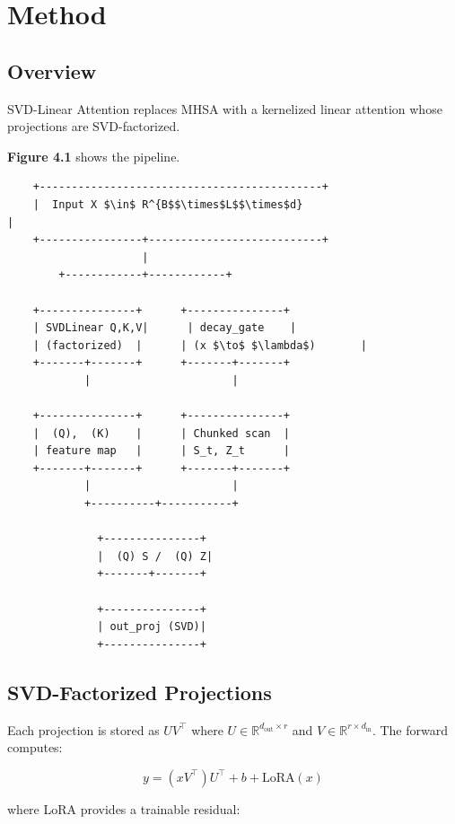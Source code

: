
\section{Method}

\subsection{Overview}

SVD-Linear Attention replaces MHSA with a kernelized linear attention 
whose projections are SVD-factorized.

\textbf{Figure 4.1} shows the pipeline.

\begin{lstlisting}
    +--------------------------------------------+
    |  Input X $\in$ R^{B$$\times$L$$\times$d}                        |
    +----------------+---------------------------+
                     |
        +------------+------------+
                                   
    +---------------+      +---------------+
    | SVDLinear Q,K,V|      | decay_gate    |
    | (factorized)  |      | (x $\to$ $\lambda$)       |
    +-------+-------+      +-------+-------+
            |                      |
                                    
    +---------------+      +---------------+
    |  (Q),  (K)    |      | Chunked scan  |
    | feature map   |      | S_t, Z_t      |
    +-------+-------+      +-------+-------+
            |                      |
            +----------+-----------+
                        
              +---------------+
              |  (Q) S /  (Q) Z|
              +-------+-------+
                       
              +---------------+
              | out_proj (SVD)|
              +---------------+
\end{lstlisting}

\subsection{SVD-Factorized Projections}

Each projection is stored as $U V^\top$ where $U \in \mathbb{R}^{d_\text{out} \times r}$ 
and $V \in \mathbb{R}^{r \times d_\text{in}}$. The forward computes:

\[
y = (x V^\top) U^\top + b + \text{LoRA}(x)
\tag{4.1}
\]

where LoRA provides a trainable residual:

